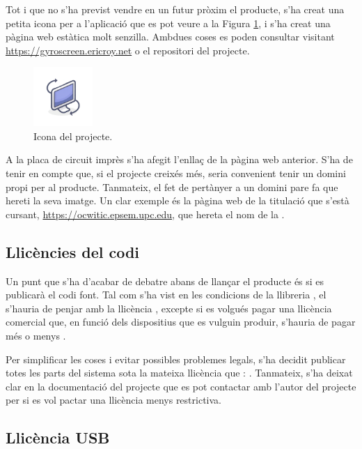 Tot i que no s'ha previst vendre en un futur pròxim el producte, s'ha creat una
petita icona per a l'aplicació que es pot veure a la Figura \ref{fig:icon},
i s'ha creat una pàgina web estàtica molt
senzilla. Ambdues coses es poden consultar visitant
\url{https://gyroscreen.ericroy.net} o el repositori del projecte.

\begin{figure}[ht]
    \centering
    \includegraphics[width=0.2\textwidth]{images/gyroscreen.png}
    \caption{Icona del projecte.}
    \label{fig:icon}
\end{figure}

A la placa de circuit imprès s'ha afegit l'enllaç de la pàgina web anterior.
S'ha de tenir en compte que, si el projecte creixés més, seria convenient tenir
un domini propi per al producte. Tanmateix, el fet de pertànyer a un domini
pare fa que hereti la seva imatge. Un clar exemple és la pàgina web de
la titulació que s'està cursant, \url{https://ocwitic.epsem.upc.edu}, que
hereta el nom de la .

\subsection{Llicències del codi}

Un punt que s'ha d'acabar de debatre abans de llançar el producte és si es
publicarà el codi font. Tal com s'ha vist en les condicions de la llibreria
, el  s'hauria de penjar amb la llicència ,
excepte si es volgués pagar una llicència comercial que, en funció dels dispositius
que es vulguin produir, s'hauria de pagar més o menys \cite{VusbLicensing}.

Per simplificar les coses i evitar possibles problemes legals, s'ha decidit
publicar totes les parts del sistema sota la mateixa llicència que :
. Tanmateix, s'ha deixat clar en la documentació del projecte que
es pot contactar amb l'autor del projecte per si es vol pactar una llicència menys
restrictiva.

\subsection{Llicència USB}

